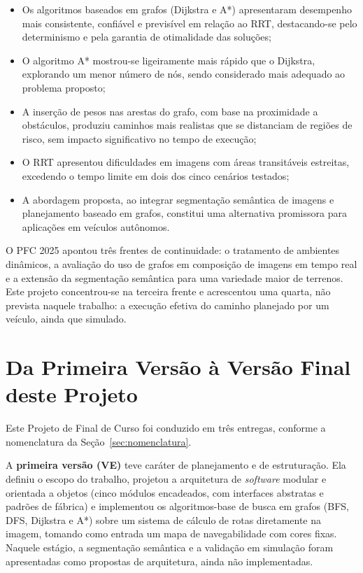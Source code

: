 \documentclass[
    12pt,
    openright,
    oneside,
    a4paper,
    english,
    brazil
]{abntex2}
\begin{document}
\begin{itemize}
    \item Os algoritmos baseados em grafos (Dijkstra e A*) apresentaram desempenho mais consistente, confiável e previsível em relação ao RRT, destacando-se pelo determinismo e pela garantia de otimalidade das soluções;
    \item O algoritmo A* mostrou-se ligeiramente mais rápido que o Dijkstra, explorando um menor número de nós, sendo considerado mais adequado ao problema proposto;
    \item A inserção de pesos nas arestas do grafo, com base na proximidade a obstáculos, produziu caminhos mais realistas que se distanciam de regiões de risco, sem impacto significativo no tempo de execução;
    \item O RRT apresentou dificuldades em imagens com áreas transitáveis estreitas, excedendo o tempo limite em dois dos cinco cenários testados;
    \item A abordagem proposta, ao integrar segmentação semântica de imagens e planejamento baseado em grafos, constitui uma alternativa promissora para aplicações em veículos autônomos.
\end{itemize}

O PFC 2025 apontou três frentes de continuidade: o tratamento de ambientes dinâmicos, a avaliação do uso de grafos em composição de imagens em tempo real e a extensão da segmentação semântica para uma variedade maior de terrenos. Este projeto concentrou-se na terceira frente e acrescentou uma quarta, não prevista naquele trabalho: a execução efetiva do caminho planejado por um veículo, ainda que simulado.

\section{Da Primeira Versão à Versão Final deste Projeto}
\label{sec:evolucao}

Este Projeto de Final de Curso foi conduzido em três entregas, conforme a nomenclatura da Seção~\ref{sec:nomenclatura}.

A \textbf{primeira versão (VE)} teve caráter de planejamento e de estruturação. Ela definiu o escopo do trabalho, projetou a arquitetura de \textit{software} modular e orientada a objetos (cinco módulos encadeados, com interfaces abstratas e padrões de fábrica) e implementou os algoritmos-base de busca em grafos (BFS, DFS, Dijkstra e A*) sobre um sistema de cálculo de rotas diretamente na imagem, tomando como entrada um mapa de navegabilidade com cores fixas. Naquele estágio, a segmentação semântica e a validação em simulação foram apresentadas como propostas de arquitetura, ainda não implementadas.
\end{document}
